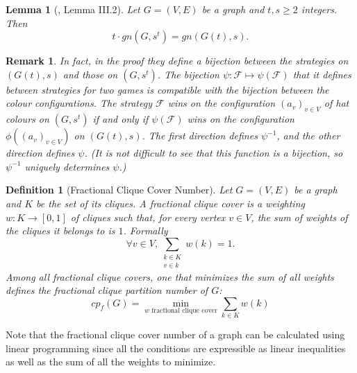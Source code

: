 \documentclass[11pt, a4paper]{kybernetika}
\newtheorem{lemma}[theorem]{Lemma}
\newtheorem{remark}[theorem]{Remark}
\newtheorem{definition}[theorem]{Definition}
\begin{document}
	\begin{lemma}[\cite{baber2016graph}, Lemma III.2]\label{lem:blow-up}
		Let $G=(V,E)$ be a graph and $t,s\ge2$ integers. Then $$t\cdot gn(G,s^t)=gn(G(t),s).$$ 
	\end{lemma}
	
	\begin{remark}
		In fact, in the proof they define a bijection between the strategies on $(G(t),s)$ and those on $(G,s^t)$.
		The bijection $\psi:\mathcal{F}\mapsto\psi(\mathcal{F})$ that it defines between strategies for two games is compatible with the bijection between the colour configurations. The strategy $\mathcal{F}$ wins on the configuration $(a_v)_{v\in V}$ of hat colours on $(G,s^t)$ if and only if $\psi(\mathcal{F})$ wins on the configuration $\phi((a_v)_{v\in V})$ on $(G(t),s)$.
		The first direction defines $\psi^{-1}$, and the other direction defines $\psi$. (It is not difficult to see that this function is a bijection, so $\psi^{-1}$ uniquely determines $\psi$.) 
	\end{remark}
	
	\begin{definition}[Fractional Clique Cover Number]
		Let $G=(V,E)$ be a graph and $K$ be the set of its cliques.
		A fractional clique cover is a weighting $w:K\to[0,1]$ of cliques such that, for every vertex $v\in V$, the sum of weights of the cliques it belongs to is $1$. Formally $$\forall v\in V,\sum_{\substack{k\in K\\v\in k}}w(k)=1.$$ Among all fractional clique covers, one that minimizes the sum of all weights defines the \emph{fractional clique partition number} of $G$:
		$$cp_f(G)=\min_{w\text{ fractional clique cover}}\sum_{k\in K}w(k)$$
	\end{definition}
	
	Note that the fractional clique cover number of a graph can be calculated using linear programming since all the conditions are expressible as linear inequalities as well as the sum of all the weights to minimize.
	
\end{document}
